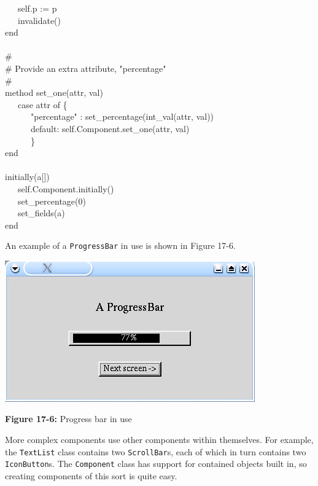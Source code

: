 {\>   \ \ \ self.p := p \\
\>   \ \ \ invalidate() \\
\>   end \\
\ \\
\>   \# \\
\>   \# Provide an extra attribute,
"percentage" \\
\>   \# \\
\>   method set\_one(attr, val) \\
\>   \ \ \ case attr of \{ \\
\>   \ \ \ \ \ \ "percentage" :
set\_percentage(int\_val(attr, val)) \\
\>   \ \ \ \ \ \ default: self.Component.set\_one(attr, val) \\
\>   \ \ \ \ \ \ \} \\
\>   end \\
\ \\
\>   initially(a[]) \\
\>   \ \ \ self.Component.initially() \\
\>   \ \ \ set\_percentage(0) \\
\>   \ \ \ set\_fields(a) \\
end \\
}

An example of a \texttt{ProgressBar} in use is shown in Figure 17-6.

\begin{center}
\includegraphics[width=4.2398in,height=2.3953in]{ub-img/ub-img55.jpg}
\end{center}

{\sffamily\bfseries Figure 17-6:}
{\sffamily Progress bar in use}

More complex components use other components within themselves. For
example, the \texttt{TextList} class contains two \texttt{ScrollBar}s,
each of which in turn contains two \texttt{IconButton}s. The
\texttt{Component} class has support for contained objects built in, so
creating components of this sort is quite easy.

